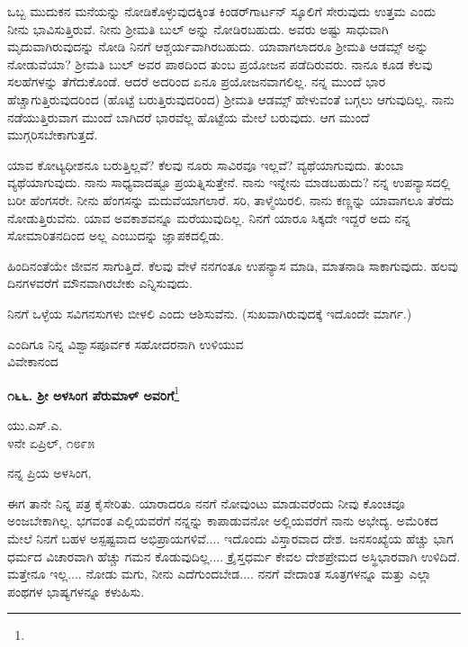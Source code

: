 ಒಬ್ಬ ಮುದುಕನ ಮನೆಯನ್ನು ನೋಡಿಕೊಳ್ಳುವುದಕ್ಕಿಂತ ಕಿಂಡರ್‌ಗಾರ್ಟನ್ ಸ್ಕೂಲಿಗೆ ಸೇರುವುದು ಉತ್ತಮ ಎಂದು ನೀನು ಭಾವಿಸುತ್ತಿರುವೆ. ನೀನು ಶ‍್ರೀಮತಿ ಬುಲ್ ಅನ್ನು ನೋಡಿರಬಹುದು. ಅವರು ಅಷ್ಟು ಸಾಧುವಾಗಿ ಮೃದುವಾಗಿರುವುದನ್ನು ನೋಡಿ ನಿನಗೆ ಆಶ್ಚರ್ಯವಾಗಿರಬಹುದು. ಯಾವಾಗಲಾದರೂ ಶ‍್ರೀಮತಿ ಆಡಮ್ಸ್ ಅನ್ನು ನೋಡುವೆಯಾ? ಶ‍್ರೀಮತಿ ಬುಲ್ ಅವರ ಪಾಠದಿಂದ ತುಂಬ ಪ್ರಯೋಜನ ಪಡೆದಿರುವರು. ನಾನೂ ಕೂಡ ಕೆಲವು ಸಲಹೆಗಳನ್ನು ತೆಗೆದುಕೊಂಡೆ. ಆದರೆ ಅದರಿಂದ ಏನೂ ಪ್ರಯೋಜನವಾಗಲಿಲ್ಲ. ನನ್ನ ಮುಂದೆ ಭಾರ ಹೆಚ್ಚಾಗುತ್ತಿರುವುದರಿಂದ (ಹೊಟ್ಟೆ ಬರುತ್ತಿರುವುದರಿಂದ) ಶ‍್ರೀಮತಿ ಆಡಮ್ಸ್ ಹೇಳುವಂತೆ ಬಗ್ಗಲು ಆಗುವುದಿಲ್ಲ. ನಾನು ನಡೆಯುತ್ತಿರುವಾಗ ಮುಂದೆ ಬಾಗಿದರೆ ಭಾರವೆಲ್ಲ ಹೊಟ್ಟೆಯ ಮೇಲೆ ಬರುವುದು. ಆಗ ಮುಂದೆ ಮುಗ್ಗರಿಸಬೇಕಾಗುತ್ತದೆ.

ಯಾವ ಕೋಟ್ಯಧೀಶನೂ ಬರುತ್ತಿಲ್ಲವೆ? ಕೆಲವು ನೂರು ಸಾವಿರವೂ ಇಲ್ಲವೆ? ವ್ಯಥೆಯಾಗುವುದು. ತುಂಬಾ ವ್ಯಥೆಯಾಗುವುದು. ನಾನು ಸಾಧ್ಯವಾದಷ್ಟೂ ಪ್ರಯತ್ನಿಸುತ್ತೇನೆ. ನಾನು ಇನ್ನೇನು ಮಾಡಬಹುದು? ನನ್ನ ಉಪನ್ಯಾಸದಲ್ಲಿ ಬರೀ ಹೆಂಗಸರೇ. ನೀನು ಹೆಂಗಸನ್ನು ಮದುವೆಯಾಗಲಾರೆ. ಸರಿ, ತಾಳ್ಮೆಯಿರಲಿ. ನಾನು ಕಣ್ಣನ್ನು ಯಾವಾಗಲೂ ತೆರೆದು ನೋಡುತ್ತಿರುವೆನು. ಯಾವ ಅವಕಾಶವನ್ನೂ ಮರೆಯುವುದಿಲ್ಲ. ನಿನಗೆ ಯಾರೂ ಸಿಕ್ಕದೇ ಇದ್ದರೆ ಅದು ನನ್ನ ಸೋಮಾರಿತನದಿಂದ ಅಲ್ಲ ಎಂಬುದನ್ನು ಜ್ಞಾಪಕದಲ್ಲಿಡು.

ಹಿಂದಿನಂತೆಯೇ ಜೀವನ ಸಾಗುತ್ತಿದೆ. ಕೆಲವು ವೇಳೆ ನನಗಂತೂ ಉಪನ್ಯಾಸ ಮಾಡಿ, ಮಾತನಾಡಿ ಸಾಕಾಗುವುದು. ಹಲವು ದಿನಗಳವರೆಗೆ ಮೌನವಾಗಿರಬೇಕು ಎನ್ನಿಸುವುದು.

\eject

ನಿನಗೆ ಒಳ್ಳೆಯ ಸವಿಗನಸುಗಳು ಬೀಳಲಿ ಎಂದು ಆಶಿಸುವೆನು. (ಸುಖವಾಗಿರುವುದಕ್ಕೆ ಇದೊಂದೇ ಮಾರ್ಗ.)
\vspace{-0.4cm}

{\flushright
ಎಂದಿಗೂ ನಿನ್ನ ವಿಶ್ವಾಸಪೂರ್ವಕ ಸಹೋದರನಾಗಿ ಉಳಿಯುವ\\ವಿವೇಕಾನಂದ\par}
\vspace{-0.4cm}

\begin{center}
\textbf{೧೬೬. ಶ‍್ರೀ ಅಳಸಿಂಗ ಪೆರುಮಾಳ್ ಅವರಿಗೆ}\footnote{}
\end{center}
\vspace{-0.4cm}

\begin{flushright}
ಯು.ಎಸ್.ಎ.\\೪ನೇ ಏಪ್ರಿಲ್, ೧೮೯೫
\end{flushright}

\noindent
ನನ್ನ ಪ್ರಿಯ ಅಳಸಿಂಗ,

ಈಗ ತಾನೇ ನಿನ್ನ ಪತ್ರ ಕೈಸೇರಿತು. ಯಾರಾದರೂ ನನಗೆ ನೋವುಂಟು ಮಾಡುವರೆಂದು ನೀವು ಕೊಂಚವೂ ಅಂಜಬೇಕಾಗಿಲ್ಲ. ಭಗವಂತ ಎಲ್ಲಿಯವರೆಗೆ ನನ್ನನ್ನು ಕಾಪಾಡುವನೋ ಅಲ್ಲಿಯವರೆಗೆ ನಾನು ಅಭೇದ್ಯ. ಅಮೆರಿಕದ ಮೇಲೆ ನಿನಗೆ ಬಹಳ ಅಸ್ಪಷ್ಟವಾದ ಅಭಿಪ್ರಾಯಗಳಿವೆ.... ಇದೊಂದು ವಿಸ್ತಾರವಾದ ದೇಶ. ಜನಸಂಖ್ಯೆಯ ಹೆಚ್ಚು ಭಾಗ ಧರ್ಮದ ವಿಚಾರವಾಗಿ ಹೆಚ್ಚು ಗಮನ ಕೊಡುವುದಿಲ್ಲ.... ಕ್ರೈಸ್ತಧರ್ಮ ಕೇವಲ ದೇಶಪ್ರೇಮದ ಅಸ್ಥಿಭಾರವಾಗಿ ಉಳಿದಿದೆ. ಮತ್ತೇನೂ ಇಲ್ಲ.... ನೋಡು ಮಗು, ನೀನು ಎದೆಗುಂದಬೇಡ.... ನನಗೆ ವೇದಾಂತ ಸೂತ್ರಗಳನ್ನೂ ಮತ್ತು ಎಲ್ಲಾ ಪಂಥಗಳ ಭಾಷ್ಯಗಳನ್ನೂ ಕಳುಹಿಸು.

